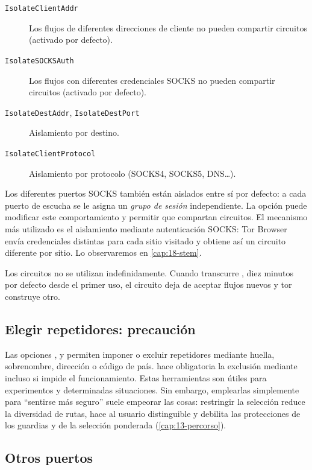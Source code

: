 \begin{description}
  \item[\texttt{IsolateClientAddr}] Los flujos de diferentes direcciones de cliente no pueden compartir circuitos (activado por defecto).
  \item[\texttt{IsolateSOCKSAuth}] Los flujos con diferentes credenciales SOCKS no pueden compartir circuitos (activado por defecto).
  \item[\texttt{IsolateDestAddr}, \texttt{IsolateDestPort}] Aislamiento por destino.
  \item[\texttt{IsolateClientProtocol}] Aislamiento por protocolo (SOCKS4, SOCKS5, DNS\ldots).
\end{description}

Los diferentes puertos SOCKS también están aislados entre sí por defecto: a cada puerto de escucha se le asigna un \emph{grupo de sesión} independiente. La opción  puede modificar este comportamiento y permitir que compartan circuitos. El mecanismo más utilizado es el aislamiento mediante autenticación SOCKS: Tor Browser envía credenciales distintas para cada sitio visitado y obtiene así un circuito diferente por sitio. Lo observaremos en \cref{cap:18-stem}.

Los circuitos no se utilizan indefinidamente. Cuando transcurre , diez minutos por defecto desde el primer uso, el circuito deja de aceptar flujos nuevos y tor construye otro.

\subsection{Elegir repetidores: precaución}

Las opciones ,  y  permiten imponer o excluir repetidores mediante huella, sobrenombre, dirección o código de país.  hace obligatoria la exclusión mediante  incluso si impide el funcionamiento. Estas herramientas son útiles para experimentos y determinadas situaciones. Sin embargo, emplearlas simplemente para \enquote{sentirse más seguro} suele empeorar las cosas: restringir la selección reduce la diversidad de rutas, hace al usuario distinguible y debilita las protecciones de los guardias y de la selección ponderada (\cref{cap:13-percorso}).

\subsection{Otros puertos}


